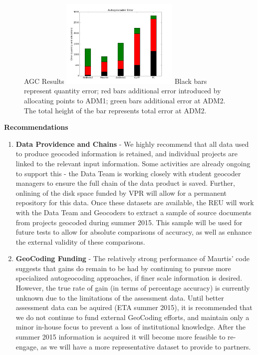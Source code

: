 \documentclass[10pt]{article}
\begin{document}
\begin{figure}{AGC Results}
\centering
\includegraphics[scale=1.0,width=0.5\textwidth]{compare_plot_20150402.png}
Black bars represent quantity error; red bars additional error introduced by allocating points to ADM1; green bars additional error at ADM2.  The total height of the bar represents total error at ADM2.
\end{figure}

\vspace{0.25cm}
\textbf{Recommendations}
\begin{enumerate}
\item \textbf{Data Providence and Chains} - We highly recommend that all data used to produce geocoded information is retained, and individual projects are linked to the relevant input information. Some activities are already ongoing to support this - the Data Team is working closely with student geocoder managers to ensure the full chain of the data product is saved. Further, onlining of the disk space funded by VPR will allow for a permanent repository for this data. Once these datasets are available, the REU will work with the Data Team and Geocoders to extract a sample of source documents from projects geocoded during summer 2015. This sample will be used for future tests to allow for absolute comparisons of accuracy, as well as enhance the external validity of these comparisons.
\item \textbf{GeoCoding Funding} - The relatively strong performance of Maurtis' code suggests that gains do remain to be had by continuing to pursue more specialized autogeocoding approaches, if finer scale information is desired.  However, the true rate of gain (in terms of percentage accuracy) is currently unknown due to the limitations of the assessment data.  Until better assessment data can be aquired (ETA summer 2015), it is recommended that we do not continue to fund external GeoCoding efforts, and maintain only a minor in-house focus to prevent a loss of institutional knowledge.  After the summer 2015 information is acquired it will become more feasible to re-engage, as we will have a more representative dataset to provide to partners.
\end{enumerate}
\end{document}
